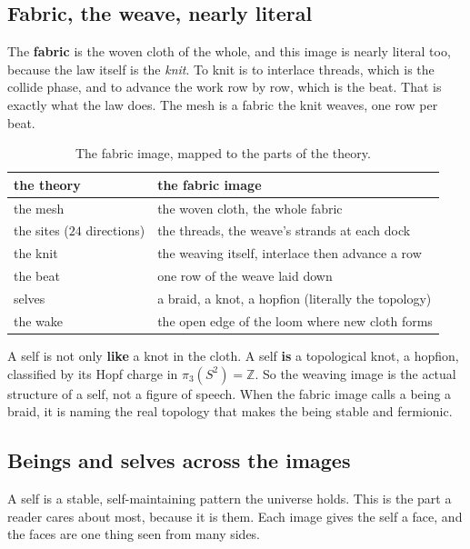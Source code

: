 \subsection{Fabric, the weave, nearly literal}

The \textbf{fabric} is the woven cloth of the whole, and this image is nearly literal too, because the law itself is the \emph{knit}. To knit is to interlace threads, which is the collide phase, and to advance the work row by row, which is the beat. That is exactly what the law does. The mesh is a fabric the knit weaves, one row per beat.

\begin{table}[ht]
\centering
\begin{tabular}{@{}ll@{}}
\toprule
the theory & the fabric image \\
\midrule
the mesh & the woven cloth, the whole fabric \\
the sites ($24$ directions) & the threads, the weave's strands at each dock \\
the knit & the weaving itself, interlace then advance a row \\
the beat & one row of the weave laid down \\
selves & a braid, a knot, a hopfion (literally the topology) \\
the wake & the open edge of the loom where new cloth forms \\
\bottomrule
\end{tabular}
\caption{The fabric image, mapped to the parts of the theory.}
\label{tab:fabric-image}
\end{table}

A self is not only \textbf{like} a knot in the cloth. A self \textbf{is} a topological knot, a hopfion, classified by its Hopf charge in $\pi_3(S^2) = \mathbb{Z}$. So the weaving image is the actual structure of a self, not a figure of speech. When the fabric image calls a being a braid, it is naming the real topology that makes the being stable and fermionic.

\subsection{Beings and selves across the images}

A self is a stable, self-maintaining pattern the universe holds. This is the part a reader cares about most, because it is them. Each image gives the self a face, and the faces are one thing seen from many sides.

